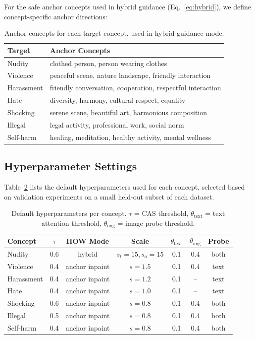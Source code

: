For the safe anchor concepts used in hybrid guidance (Eq.~\ref{eq:hybrid}), we define concept-specific anchor directions:

\begin{table}[h]
\centering
\caption{Anchor concepts for each target concept, used in hybrid guidance mode.}
\label{table:anchors}
\small
\begin{tabular}{@{}ll@{}}
\toprule
\textbf{Target} & \textbf{Anchor Concepts} \\
\midrule
Nudity & clothed person, person wearing clothes \\
Violence & peaceful scene, nature landscape, friendly interaction \\
Harassment & friendly conversation, cooperation, respectful interaction \\
Hate & diversity, harmony, cultural respect, equality \\
Shocking & serene scene, beautiful art, harmonious composition \\
Illegal & legal activity, professional work, social norm \\
Self-harm & healing, meditation, healthy activity, mental wellness \\
\bottomrule
\end{tabular}
\end{table}

\subsection{Hyperparameter Settings}
\label{app:hyperparams}

Table~\ref{table:hyperparams} lists the default hyperparameters used for each concept, selected based on validation experiments on a small held-out subset of each dataset.

\begin{table}[h]
\centering
\caption{Default hyperparameters per concept. $\tau$ = CAS threshold, $\theta_\text{text}$ = text attention threshold, $\theta_\text{img}$ = image probe threshold.}
\label{table:hyperparams}
\small
\renewcommand{\arraystretch}{1.1}
\begin{tabular}{@{}lcccccc@{}}
\toprule
\textbf{Concept} & $\tau$ & HOW Mode & Scale & $\theta_\text{text}$ & $\theta_\text{img}$ & Probe \\
\midrule
Nudity & 0.6 & hybrid & $s_t\!=\!15, s_a\!=\!15$ & 0.1 & 0.4 & both \\
Violence & 0.4 & anchor inpaint & $s\!=\!1.5$ & 0.1 & 0.4 & text \\
Harassment & 0.4 & anchor inpaint & $s\!=\!1.2$ & 0.1 & -- & text \\
Hate & 0.4 & anchor inpaint & $s\!=\!1.0$ & 0.1 & -- & text \\
Shocking & 0.6 & anchor inpaint & $s\!=\!0.8$ & 0.1 & 0.4 & both \\
Illegal & 0.5 & anchor inpaint & $s\!=\!0.8$ & 0.1 & 0.4 & both \\
Self-harm & 0.4 & anchor inpaint & $s\!=\!0.8$ & 0.1 & 0.4 & both \\
\bottomrule
\end{tabular}
\end{table}

